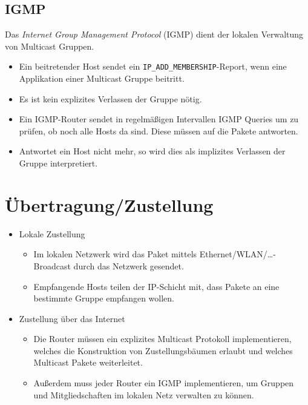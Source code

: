 		\subsection{IGMP}
			Das \textit{Internet Group Management Protocol} (IGMP) dient der lokalen Verwaltung von Multicast Gruppen.
			\begin{itemize}
				\item Ein beitretender Host sendet ein \texttt{IP\_ADD\_MEMBERSHIP}-Report, wenn eine Applikation einer Multicast Gruppe beitritt.
				\item Es ist kein explizites Verlassen der Gruppe nötig.
				\item Ein IGMP-Router sendet in regelmäßigen Intervallen IGMP Queries um zu prüfen, ob noch alle Hosts da sind. Diese müssen auf die Pakete antworten.
				\item Antwortet ein Host nicht mehr, so wird dies als implizites Verlassen der Gruppe interpretiert.
			\end{itemize}

	\section{Übertragung/Zustellung}
		\begin{itemize}
			\item Lokale Zustellung
				\begin{itemize}
					\item Im lokalen Netzwerk wird das Paket mittels Ethernet/WLAN/\dots-Broadcast durch das Netzwerk gesendet.
					\item Empfangende Hosts teilen der IP-Schicht mit, dass Pakete an eine bestimmte Gruppe empfangen wollen.
				\end{itemize}
			\item Zustellung über das Internet
				\begin{itemize}
					\item Die Router müssen ein explizites Multicast Protokoll implementieren, welches die Konstruktion von Zustellungsbäumen erlaubt und welches Multicast Pakete weiterleitet.
					\item Außerdem muss jeder Router ein IGMP implementieren, um Gruppen und Mitgliedschaften im lokalen Netz verwalten zu können.
				\end{itemize}
		\end{itemize}

